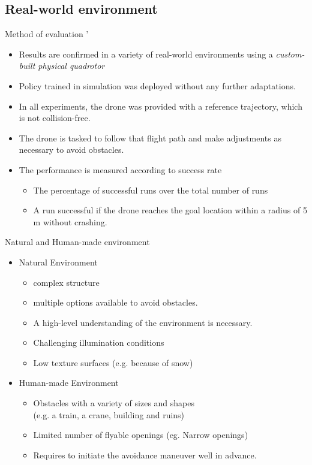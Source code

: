 \documentclass{beamer}
\begin{document}
\subsection{Real-world environment}
\begin{frame}{Method of evaluation}
	'\begin{itemize}
		\item Results are confirmed in a variety of real-world environments using a \textit{custom-built physical quadrotor}
		\item Policy trained in simulation was deployed without any further adaptations.
		\item In all experiments, the drone was provided with a reference trajectory, which is not collision-free.
		\item The drone is tasked to follow that flight path and make adjustments as necessary to avoid obstacles.
		\item The performance is measured according to success rate
		\begin{itemize}
			\item The percentage of successful runs over the total number of runs
			\item A run successful if the drone reaches the goal location within a radius of 5 m without crashing.
		\end{itemize} 
	\end{itemize}
\end{frame}

\begin{frame}{Natural and Human-made environment}
	\begin{itemize}
		\item Natural Environment
		\begin{itemize}
			\item complex structure
			\item multiple options available to avoid obstacles. 
			\item A high-level understanding of the environment is necessary.
			\item Challenging illumination conditions
			\item Low texture surfaces (e.g. because of snow)
		\end{itemize}
	
		\item Human-made Environment
		\begin{itemize}
			\item Obstacles with a variety of sizes and shapes \\
			(e.g. a train, a crane, building and ruins)
			\item Limited number of flyable openings (eg. Narrow openings)
			\item Requires to initiate the avoidance maneuver well in advance.
		\end{itemize}
	\end{itemize}	
\end{frame}
\end{document}

